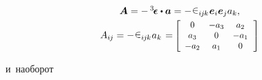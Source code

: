\begin{otherlanguage}{russian}
\nopagebreak\vspace{-0.1em}\begin{equation*}
\begin{array}{c}
\bm{A} = - \, \levicivitatensor \dotp \bm{a} = - \hspace{.1ex} \levicivita_{i\hspace{-0.1ex}j\hspace{-0.1ex}k} \hspace{.1ex} \bm{e}_i \bm{e}_j a_k ,
\\[.3em]
A_{i\hspace{-0.1ex}j} = - \hspace{.1ex} \levicivita_{i\hspace{-0.1ex}j\hspace{-0.1ex}k} \hspace{.1ex} a_k \hspace{.1em} = \hspace{-0.1em}
\scalebox{0.9}[0.9]{$\left[ \begin{array}{ccc}
0 & -a_3 & a_2 \\
a_3 & 0 & -a_1 \\
-a_2 & a_1 & 0
\end{array} \hspace{.25ex}\right]$}
\end{array}
\end{equation*}

\vspace{-0.4em} \noindent и~наоборот


\end{otherlanguage}
